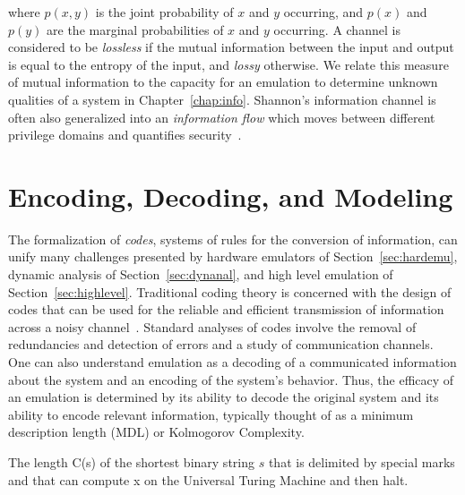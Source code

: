 \noindent
where $p(x,y)$ is the joint probability of $x$ and $y$ occurring, and $p(x)$ and $p(y)$ are the marginal probabilities of $x$ and $y$ occurring.
A channel is considered to be \emph{lossless} if the mutual information between the input and output is equal to the entropy of the input, and \emph{lossy} otherwise.
We relate this measure of mutual information to the capacity for an emulation to determine unknown qualities of a system in Chapter~\ref{chap:info}.
Shannon's information channel is often also generalized into an \emph{information flow} which moves between different privilege domains and quantifies security~\cite{sabelfeld2003language, lowe2002quantifying}.

\section{Encoding, Decoding, and Modeling}
\label{sec:encdec}

The formalization of \emph{codes}, systems of rules for the conversion of information, can unify many challenges presented by hardware emulators of Section~\ref{sec:hardemu}, dynamic analysis of Section~\ref{sec:dynanal}, and high level emulation of Section~\ref{sec:highlevel}.
Traditional coding theory is concerned with the design of codes that can be used for the reliable and efficient transmission of information across a noisy channel~\cite{van1971coding, richardson2008modern, bierbrauer2016introduction}.
Standard analyses of codes involve the removal of redundancies and detection of errors and a study of communication channels.
One can also understand emulation as a decoding of a communicated information about the system and an encoding of the system's behavior.
Thus, the efficacy of an emulation is determined by its ability to decode the original system and its ability to encode relevant information, typically thought of as a minimum description length (MDL) or Kolmogorov Complexity.

\begin{definition}
The length C(s) of the shortest binary string $s$ that is delimited by special marks and that can compute x on the Universal Turing Machine and then halt.
\end{definition}

